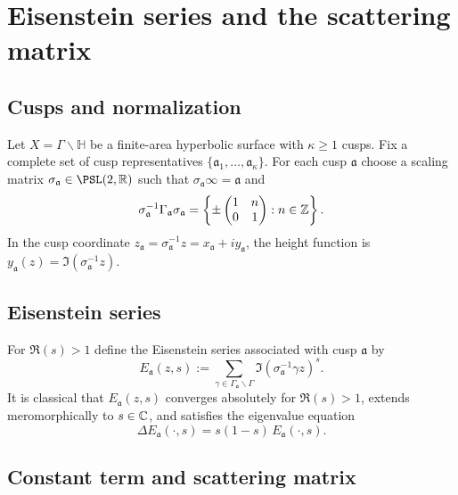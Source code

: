 \section{Eisenstein series and the scattering matrix}
\label{sec:K.eisenstein}

\subsection{Cusps and normalization}
\label{subsec:K.cusps}

Let $X=\Gamma\backslash\mathbb{H}$ be a finite-area hyperbolic surface with $\kappa\ge 1$ cusps.
Fix a complete set of cusp representatives $\{\mathfrak{a}_1,\dots,\mathfrak{a}_\kappa\}$.
For each cusp $\mathfrak{a}$ choose a scaling matrix $\sigma_{\mathfrak{a}}\in \PSL(2,\R)$ such that
$\sigma_{\mathfrak{a}}\infty=\mathfrak{a}$ and
\[
\sigma_{\mathfrak{a}}^{-1}\Gamma_{\mathfrak{a}}\sigma_{\mathfrak{a}}
=
\left\{
\pm
\begin{pmatrix} 1 & n \\ 0 & 1 \end{pmatrix}
: n\in\mathbb{Z}
\right\}.
\]
In the cusp coordinate $z_{\mathfrak{a}}=\sigma_{\mathfrak{a}}^{-1}z=x_{\mathfrak{a}}+iy_{\mathfrak{a}}$,
the height function is $y_{\mathfrak{a}}(z)=\Im(\sigma_{\mathfrak{a}}^{-1}z)$.

\subsection{Eisenstein series}
\label{subsec:K.eisenstein.def}

For $\Re(s)>1$ define the Eisenstein series associated with cusp $\mathfrak{a}$ by
\begin{equation}\label{eq:K.eisenstein.def}
E_{\mathfrak{a}}(z,s)
:=
\sum_{\gamma\in \Gamma_{\mathfrak{a}}\backslash\Gamma}
\Im(\sigma_{\mathfrak{a}}^{-1}\gamma z)^s.
\end{equation}
It is classical that $E_{\mathfrak{a}}(z,s)$ converges absolutely for $\Re(s)>1$,
extends meromorphically to $s\in\mathbb{C}$, and satisfies the eigenvalue equation
\begin{equation}\label{eq:K.eisenstein.eig}
\Delta E_{\mathfrak{a}}(\cdot,s)
=
s(1-s)\,E_{\mathfrak{a}}(\cdot,s).
\end{equation}

\subsection{Constant term and scattering matrix}
\label{subsec:K.constant.term}

